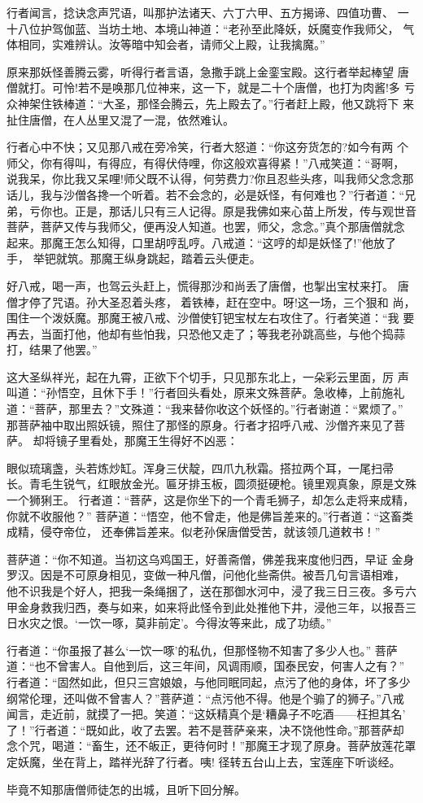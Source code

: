 行者闻言，捻诀念声咒语，叫那护法诸天、六丁六甲、五方揭谛、四值功曹、
一十八位护驾伽蓝、当坊土地、本境山神道：“老孙至此降妖，妖魔变作我师父，
气体相同，实难辨认。汝等暗中知会者，请师父上殿，让我擒魔。”

原来那妖怪善腾云雾，听得行者言语，急撒手跳上金銮宝殿。这行者举起棒望
唐僧就打。可怜!若不是唤那几位神来，这一下，就是二十个唐僧，也打为肉酱!多
亏众神架住铁棒道：“大圣，那怪会腾云，先上殿去了。”行者赶上殿，他又跳将下
来扯住唐僧，在人丛里又混了一混，依然难认。

行者心中不快；又见那八戒在旁冷笑，行者大怒道：“你这夯货怎的?如今有两
个师父，你有得叫，有得应，有得伏侍哩，你这般欢喜得紧！”八戒笑道：“哥啊，
说我呆，你比我又呆哩!师父既不认得，何劳费力?你且忍些头疼，叫我师父念念那
话儿，我与沙僧各搀一个听着。若不会念的，必是妖怪，有何难也？”行者道：“兄
弟，亏你也。正是，那话儿只有三人记得。原是我佛如来心苗上所发，传与观世音
菩萨，菩萨又传与我师父，便再没人知道。也罢，师父，念念。”真个那唐僧就念
起来。那魔王怎么知得，口里胡哼乱哼。八戒道：“这哼的却是妖怪了!”他放了手，
举钯就筑。那魔王纵身跳起，踏着云头便走。

好八戒，喝一声，也驾云头赶上，慌得那沙和尚丢了唐僧，也掣出宝杖来打。
唐僧才停了咒语。孙大圣忍着头疼，着铁棒，赶在空中。呀!这一场，三个狠和
尚，围住一个泼妖魔。那魔王被八戒、沙僧使钉钯宝杖左右攻住了。行者笑道：“我
要再去，当面打他，他却有些怕我，只恐他又走了；等我老孙跳高些，与他个捣蒜
打，结果了他罢。”

这大圣纵祥光，起在九霄，正欲下个切手，只见那东北上，一朵彩云里面，厉
声叫道：“孙悟空，且休下手！”行者回头看处，原来文殊菩萨。急收棒，上前施礼
道：“菩萨，那里去？”文殊道：“我来替你收这个妖怪的。”行者谢道：“累烦了。”
那菩萨袖中取出照妖镜，照住了那怪的原身。行者才招呼八戒、沙僧齐来见了菩萨。
却将镜子里看处，那魔王生得好不凶恶：

眼似琉璃盏，头若炼炒缸。浑身三伏靛，四爪九秋霜。搭拉两个耳，一尾扫帚
长。青毛生锐气，红眼放金光。匾牙排玉板，圆须挺硬枪。镜里观真象，原是文殊
一个狮猁王。
行者道：“菩萨，这是你坐下的一个青毛狮子，却怎么走将来成精，你就不收服他？”
菩萨道：“悟空，他不曾走，他是佛旨差来的。”行者道：“这畜类成精，侵夺帝位，
还奉佛旨差来。似老孙保唐僧受苦，就该领几道敕书！”

菩萨道：“你不知道。当初这乌鸡国王，好善斋僧，佛差我来度他归西，早证
金身罗汉。因是不可原身相见，变做一种凡僧，问他化些斋供。被吾几句言语相难，
他不识我是个好人，把我一条绳捆了，送在那御水河中，浸了我三日三夜。多亏六
甲金身救我归西，奏与如来，如来将此怪令到此处推他下井，浸他三年，以报吾三
日水灾之恨。‘一饮一啄，莫非前定’。今得汝等来此，成了功绩。”

行者道：“你虽报了甚么‘一饮一啄’的私仇，但那怪物不知害了多少人也。”
菩萨道：“也不曾害人。自他到后，这三年间，风调雨顺，国泰民安，何害人之有？”
行者道：“固然如此，但只三宫娘娘，与他同眠同起，点污了他的身体，坏了多少
纲常伦理，还叫做不曾害人？”菩萨道：“点污他不得。他是个骟了的狮子。”八戒
闻言，走近前，就摸了一把。笑道：“这妖精真个是‘糟鼻子不吃酒——枉担其名’
了！”行者道：“既如此，收了去罢。若不是菩萨亲来，决不饶他性命。”那菩萨却
念个咒，喝道：“畜生，还不皈正，更待何时！”那魔王才现了原身。菩萨放莲花罩
定妖魔，坐在背上，踏祥光辞了行者。咦!
径转五台山上去，宝莲座下听谈经。

毕竟不知那唐僧师徒怎的出城，且听下回分解。